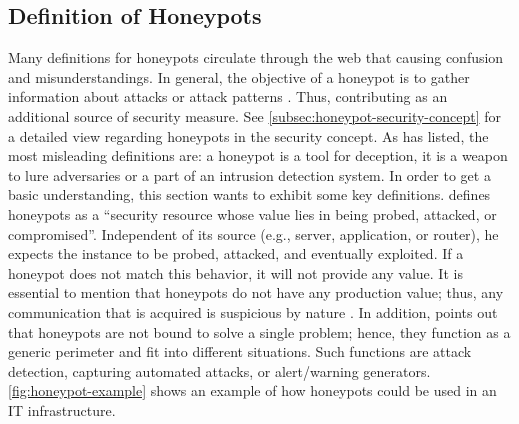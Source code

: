 \subsection{Definition of Honeypots}

Many definitions for honeypots circulate through the web that causing confusion and misunderstandings.
In general, the objective of a honeypot is to gather information about attacks or attack patterns \cite{NawrockiWSKS2016}.
Thus, contributing as an additional source of security measure.
See \autoref{subsec:honeypot-security-concept} for a detailed view regarding honeypots in the security concept.
As \citet{Spitzner2003} has listed, the most misleading definitions are: a honeypot is a tool for deception, it is a weapon to lure adversaries or a part of an intrusion detection system.
In order to get a basic understanding, this section wants to exhibit some key definitions.
\citet{Spitzner2003} defines honeypots as a \enquote{security resource whose value lies in being probed, attacked, or compromised}.
Independent of its source (e.g., server, application, or router), he expects the instance to be probed, attacked, and eventually exploited.
If a honeypot does not match this behavior, it will not provide any value.
It is essential to mention that honeypots do not have any production value; thus, any communication that is acquired is suspicious by nature \cite{Spitzner2003}.
In addition, \citet{Spitzner2003} points out that honeypots are not bound to solve a single problem; hence, they function as a generic perimeter and fit into different situations.
Such functions are attack detection, capturing automated attacks, or alert/warning generators.
\autoref{fig:honeypot-example} shows an example of how honeypots could be used in an IT infrastructure.

